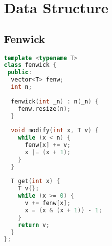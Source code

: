\section{Data Structure}
\subsection{Fenwick}
\begin{lstlisting}[language=C++]
template <typename T>
class fenwick {
 public:
  vector<T> fenw;
  int n;
 
  fenwick(int _n) : n(_n) {
    fenw.resize(n);
  }
 
  void modify(int x, T v) {
    while (x < n) {
      fenw[x] += v;
      x |= (x + 1);
    }
  }
 
  T get(int x) {
    T v{};
    while (x >= 0) {
      v += fenw[x];
      x = (x & (x + 1)) - 1;
    }
    return v;
  }
};
\end{lstlisting}
